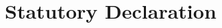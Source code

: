 \documentclass[11pt, a4paper]{article} %
\makeatletter
\theoremstyle{definition}
\newcommand{\signature}[2][5cm]{%
  \begin{tabular}{@{}p{#1}@{}}
    #2 \\[2\normalbaselineskip] \hrule \\[0pt]
    {\small \textit{Signature}} \\[2\normalbaselineskip] \hrule \\[0pt]
    {\small \textit{Place, Date}}
  \end{tabular}
}
\makeatother
\begin{document}
\section*{Statutory Declaration} %

\vspace*{1in} %





\end{document}
